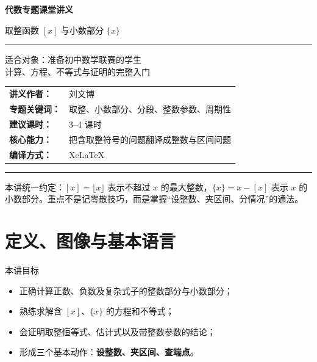 \documentclass[11pt,a4paper,fontset=fandol]{ctexart}
\theoremstyle{formaltheorem}
\theoremstyle{formalexample}
\begin{document}
\thispagestyle{empty}
\begin{titlepage}
\centering\vspace*{0.9cm}
\begin{tcolorbox}[enhanced,width=0.92\textwidth,colback=white,colframe=mainblue,boxrule=1pt,arc=0mm,left=6mm,right=6mm,top=8mm,bottom=8mm]
\centering
{\fontsize{24}{30}\selectfont\bfseries 代数专题课堂讲义\par}
\vspace{0.7cm}
{\fontsize{18}{23}\selectfont 取整函数 $[x]$ 与小数部分 $\{x\}$\par}
\vspace{1cm}\color{rulegray}\rule{0.72\textwidth}{0.7pt}\par\vspace{0.9cm}
\begin{tcolorbox}[colback=lightblue,colframe=mainblue,width=0.84\textwidth,boxrule=1pt]
\centering
{\Large 适合对象：准备初中数学联赛的学生}\\[0.4em]
{\large 计算、方程、不等式与证明的完整入门}
\end{tcolorbox}
\vspace{1.1cm}
\renewcommand{\arraystretch}{1.42}
\begin{tabular}{>{\bfseries}p{3.2cm}p{8.2cm}}
讲义作者： & 刘文博 \\
专题关键词： & 取整、小数部分、分段、整数参数、周期性 \\
建议课时： & 3--4 课时 \\
核心能力： & 把含取整符号的问题翻译成整数与区间问题 \\
编译方式： & XeLaTeX
\end{tabular}
\vspace{1cm}\color{rulegray}\rule{0.72\textwidth}{0.7pt}\par\vspace{0.7cm}
{\normalsize 本讲统一约定：$[x]=\lfloor x\rfloor$ 表示不超过 $x$ 的最大整数，$\{x\}=x-[x]$ 表示 $x$ 的小数部分。重点不是记零散技巧，而是掌握“设整数、夹区间、分情况”的通法。\par}
\vspace{0.5cm}{\large \today\par}
\end{tcolorbox}
\end{titlepage}

\pagestyle{plain}\tableofcontents\newpage
\pagestyle{fancy}

\section{定义、图像与基本语言}
\begin{goalbox}{本讲目标}
\begin{itemize}
  \item 正确计算正数、负数及复杂式子的整数部分与小数部分；
  \item 熟练求解含 $[x]$、$\{x\}$ 的方程和不等式；
  \item 会证明取整恒等式、估计式以及带整数参数的结论；
  \item 形成三个基本动作：\textbf{设整数、夹区间、查端点}。
\end{itemize}
\end{goalbox}
\end{document}
